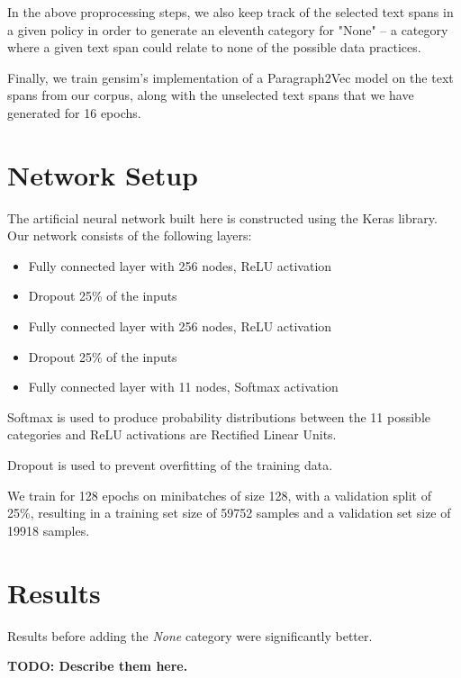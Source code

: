 \documentclass[12pt, letterpaper]{article}
\begin{document}
In the above proprocessing steps, we also keep track of the selected text spans in a given policy in order to generate an eleventh category for "None" -- a category where a given text span could relate to none of the possible data practices.

Finally, we train gensim's implementation of a Paragraph2Vec model on the text spans from our corpus, along with the unselected text spans that we have generated for 16 epochs.


\section{Network Setup}
The artificial neural network built here is constructed using the Keras library. Our network consists of the following layers:

\begin{itemize}
\item Fully connected layer with 256 nodes, ReLU activation
\item Dropout 25\% of the inputs
\item Fully connected layer with 256 nodes, ReLU activation
\item Dropout 25\% of the inputs
\item Fully connected layer with 11 nodes, Softmax activation
\end{itemize}

Softmax is used to produce probability distributions between the 11 possible categories and ReLU activations are Rectified Linear Units. 

Dropout is used to prevent overfitting of the training data.

We train for 128 epochs on minibatches of size 128, with a validation split of 25\%, resulting in a training set size of 59752 samples and a validation set size of 19918 samples.

\section{Results}
Results before adding the \textit{None} category were significantly better. 

\textbf{TODO: Describe them here.}
\end{document}
